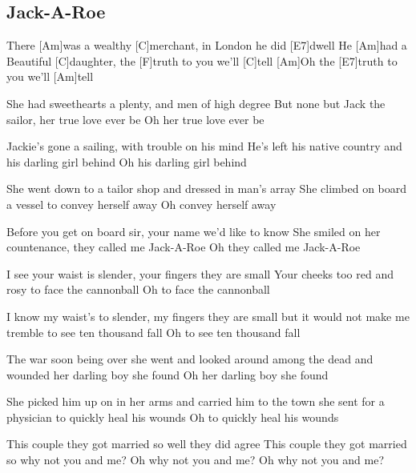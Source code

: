 \subsection*{Jack-A-Roe   }



\begin{guitar}


There [Am]was a wealthy [C]merchant, in London he did [E7]dwell
He [Am]had a Beautiful [C]daughter, the [F]truth to you we'll [C]tell
[Am]Oh the [E7]truth to you we'll [Am]tell


She had sweethearts a plenty, and men of high degree
But none but Jack the sailor, her true love ever be
Oh her true love ever be

Jackie's gone a sailing, with trouble on his mind
He's left his native country and his darling girl behind
Oh his darling girl behind

She went down to a tailor shop and dressed in man's array
She climbed on board a vessel to convey herself away
Oh convey herself away

Before you get on board sir, your name we'd like to know
She smiled on her countenance, they called me Jack-A-Roe
Oh they called me Jack-A-Roe

I see your waist is slender, your fingers they are small
Your cheeks too red and rosy to face the cannonball
Oh to face the cannonball

I know my waist's to slender, my fingers they are small
but it would not make me tremble to see ten thousand fall
Oh to see ten thousand fall

The war soon being over she went and looked around
among the dead and wounded her darling boy she found
Oh her darling boy she found

She picked him up on in her arms and carried him to the town
she sent for a physician to quickly heal his wounds
Oh to quickly heal his wounds

This couple they got married so well they did agree
This couple they got married so why not you and me?
Oh why not you and me?
Oh why not you and me? 
\end{guitar}
